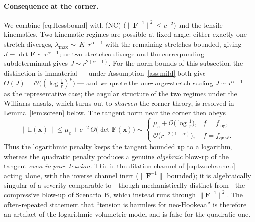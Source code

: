 \paragraph{Consequence at the corner.}
We combine \eqref{eq:Hessbound} with (NC) ($\|\bm{F}^{-1}\|^2\le c^{-2}$) and the tensile kinematics. Two kinematic
regimes are possible at fixed angle: either exactly one stretch diverges, $\lambda_{\max}\sim|K|\,r^{\alpha-1}$ with the
remaining stretches bounded, giving $J=\det\bm{F}\sim r^{\alpha-1}$; or two stretches diverge and the corresponding
subdeterminant gives $J\sim r^{2(\alpha-1)}$. For the norm bounds of this subsection the distinction is immaterial ---
under Assumption~\ref{ass:mild} both give $\Theta(J)=\mathcal{O}\big((\log\tfrac1r)^p\big)$ --- and we quote the
one-large-stretch scaling $J\sim r^{\alpha-1}$ as the representative case; the angular structure of the two regimes
under the Williams ansatz, which turns out to \emph{sharpen} the corner theory, is resolved in
Lemma~\ref{lem:screen} below. The tangent norm near the corner then obeys
\begin{equation}
    \label{eq:Lcornergrowth}
    \|\mathbb{L}(\bm{x})\| \le \mu_e + c^{-2}\,\Theta\!\big(\det\bm{F}(\bm{x})\big) \sim
    \begin{cases}
        \mu_e + \mathcal{O}\!\big(\log\tfrac1r\big), & f=f_{\log},          \\[4pt]
        \mathcal{O}\!\big(r^{-2(1-\alpha)}\big),     & f=f_{\mathrm{quad}}.
    \end{cases}
\end{equation}
Thus the logarithmic penalty keeps the tangent bounded up to a logarithm, whereas the quadratic penalty produces a
genuine \emph{algebraic} blow-up of the tangent \emph{even in pure tension}. This is the dilation channel of
\eqref{eq:twochannels} acting alone, with the inverse channel inert ($\|\bm{F}^{-1}\|$ bounded); it is algebraically
singular of a severity comparable to---though mechanistically distinct from---the compressive blow-up of Scenario~B,
which instead runs through $\|\bm{F}^{-1}\|^2$. The often-repeated statement that ``tension is harmless for
neo-Hookean'' is therefore an artefact of the logarithmic volumetric model and is false for the quadratic one.

